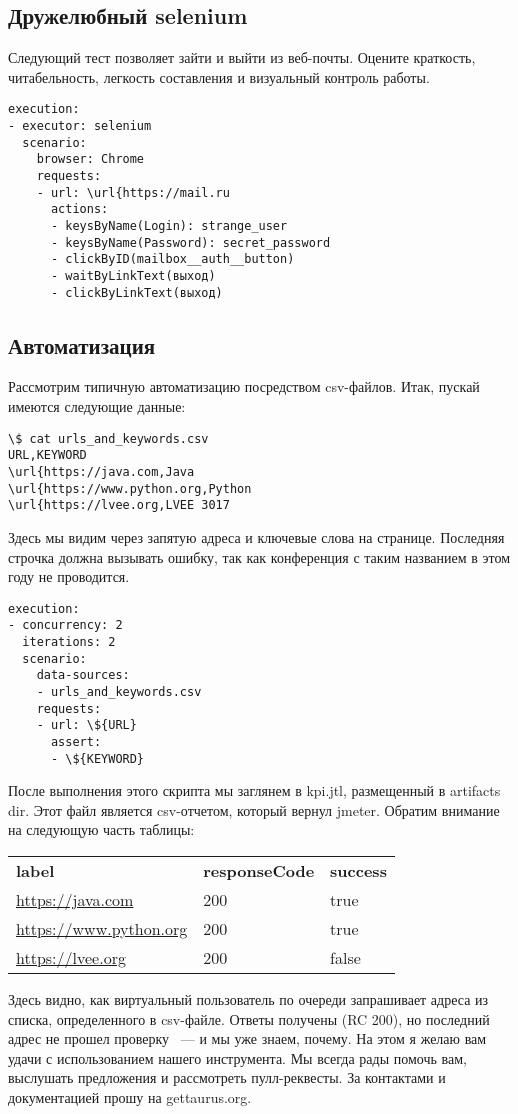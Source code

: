 \documentclass[10pt, a5paper]{article}
\begin{document}
\subsection*{Дружелюбный selenium}

Следующий тест позволяет зайти и выйти из веб-почты. Оцените краткость, читабельность, легкость составления и визуальный контроль работы.

\begin{verbatim}
execution:
- executor: selenium
  scenario: 
    browser: Chrome
    requests:
    - url: \url{https://mail.ru
      actions:
      - keysByName(Login): strange_user
      - keysByName(Password): secret_password
      - clickByID(mailbox__auth__button)
      - waitByLinkText(выход)
      - clickByLinkText(выход)\end{verbatim}
\subsection*{Автоматизация}

Рассмотрим типичную автоматизацию посредством csv-файлов. Итак, пускай имеются следующие данные:

\begin{verbatim}
\$ cat urls_and_keywords.csv
URL,KEYWORD
\url{https://java.com,Java
\url{https://www.python.org,Python
\url{https://lvee.org,LVEE 3017\end{verbatim}
Здесь мы видим через запятую адреса и ключевые слова на странице. Последняя строчка должна вызывать ошибку, так как конференция с таким названием в этом году не проводится.

\begin{verbatim}
execution:
- concurrency: 2
  iterations: 2
  scenario:
    data-sources:
    - urls_and_keywords.csv
    requests:
    - url: \${URL}
      assert:
      - \${KEYWORD}\end{verbatim}
После выполнения этого скрипта мы заглянем в kpi.jtl, размещенный в artifacts dir. Этот файл является csv-отчетом, который вернул jmeter. Обратим внимание на следующую часть таблицы:

\begin{table}[h!]
  \centering
  \begin{tabular}{ l l l }
    \textbf{label} & \textbf{responseCode} & \textbf{success} \\
    \url{https://java.com} & 200 & true \\
    \url{https://www.python.org} & 200 & true \\
    \url{https://lvee.org} & 200 & false \\
  \end{tabular}
\end{table}
Здесь видно, как виртуальный пользователь по очереди запрашивает адреса из списка, определенного в csv-файле. Ответы получены (RC 200), но последний адрес не прошел проверку ~--- и мы уже знаем, почему.
На этом я желаю вам удачи с использованием нашего инструмента. Мы всегда рады помочь вам, выслушать предложения и рассмотреть пулл-реквесты. За контактами и документацией прошу на gettaurus.org.
\end{document}
